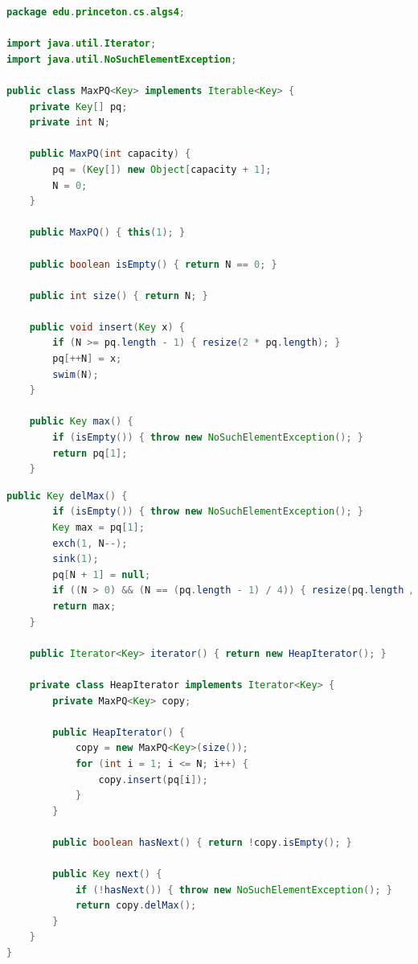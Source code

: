 \documentclass[8pt,a4paper,compress]{beamer}
\begin{document}
\begin{frame}[fragile]
\pause

\begin{lstlisting}[language=Java]
package edu.princeton.cs.algs4;

import java.util.Iterator;
import java.util.NoSuchElementException;

public class MaxPQ<Key> implements Iterable<Key> {
    private Key[] pq;
    private int N;
    
    public MaxPQ(int capacity) {
        pq = (Key[]) new Object[capacity + 1];
        N = 0;
    }

    public MaxPQ() { this(1); }
    
    public boolean isEmpty() { return N == 0; }

    public int size() { return N; }

    public void insert(Key x) {
        if (N >= pq.length - 1) { resize(2 * pq.length); }
        pq[++N] = x;
        swim(N);
    }

    public Key max() {
        if (isEmpty()) { throw new NoSuchElementException(); }
        return pq[1];
    }
\end{lstlisting}
\end{frame}

\begin{frame}[fragile]
\pause

\begin{lstlisting}[language=Java]    
    public Key delMax() {
        if (isEmpty()) { throw new NoSuchElementException(); }
        Key max = pq[1];
        exch(1, N--);
        sink(1);
        pq[N + 1] = null; 
        if ((N > 0) && (N == (pq.length - 1) / 4)) { resize(pq.length / 2); }
        return max;
    }
    
    public Iterator<Key> iterator() { return new HeapIterator(); }
    
    private class HeapIterator implements Iterator<Key> {
        private MaxPQ<Key> copy;

        public HeapIterator() {
            copy = new MaxPQ<Key>(size());
            for (int i = 1; i <= N; i++) { 
                copy.insert(pq[i]); 
            }
        }

        public boolean hasNext() { return !copy.isEmpty(); }

        public Key next() {
            if (!hasNext()) { throw new NoSuchElementException(); }
            return copy.delMax();
        }
    }
}
\end{lstlisting}
\end{frame}
\end{document}
